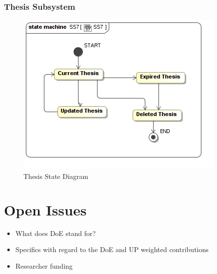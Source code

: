 \documentclass{article}
\begin{document}
			\subsubsection{Thesis Subsystem}
				\begin{figure}
					\includegraphics[width=\textwidth]{5.4-SS5-7/SS7}
					\caption{Thesis State Diagram}
				\end{figure}
	\section{Open Issues}
	\begin{itemize}
		\item What does DoE stand for?
		\item Specifics with regard to the DoE and UP weighted contributions
		\item Researcher funding
	\end{itemize}
\end{document}
